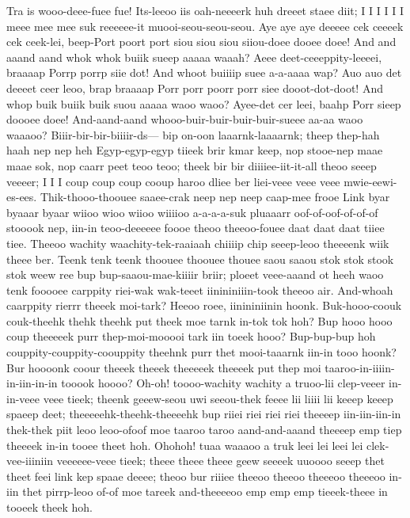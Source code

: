 \documentclass[12pt,a4paper]{article}
\begin{document}
\begin{drama}
\pistspeaks
Tra is wooo-deee-fuee fue!
\messspeaks
Its-leeoo iis oah-neeeerk huh dreeet staee diit; I I I I I I meee mee mee suk reeeeee-it muooi-seou-seou-seou.
\pistspeaks
Aye aye aye deeeee cek ceeeek cek ceek-lei, beep-Port poort port siou siou siou siiou-doee dooee doee! And and aaand aand whok whok buiik sueep aaaaa waaah? Aeee deet-ceeeppity-leeeei, braaaap Porrp porrp siie dot! And whoot buiiiip suee a-a-aaaa wap? Auo auo det deeeet ceer leoo, brap braaaap Porr porr poorr porr siee dooot-dot-doot! And whop buik buiik buik suou aaaaa waoo waoo? Ayee-det cer leei, baahp Porr sieep doooee doee! And-aand-aand whooo-buir-buir-buir-buir-sueee aa-aa waoo waaaoo?
\messspeaks
Biiir-bir-bir-biiiir-ds— bip on-oon laaarnk-laaaarnk; theep thep-hah haah nep nep heh Egyp-egyp-egyp tiieek brir kmar keep, nop stooe-nep maae maae sok, nop caarr peet teoo teoo; theek bir bir diiiiee-iit-it-all theoo seeep veeeer; I I I coup coup coup cooup haroo dliee ber liei-veee veee veee mwie-eewi-es-ees. Thik-thooo-thoouee saaee-crak neep nep neep caap-mee frooe Link byar byaaar byaar wiioo wioo wiioo wiiiioo a-a-a-a-suk pluaaarr oof-of-oof-of-of-of stooook nep, iin-in teoo-deeeeee foooe theoo theeoo-fouee daat daat daat tiiee tiee. Theeoo wachity waachity-tek-raaiaah chiiiip chip seeep-leoo theeeenk wiik theee ber. Teenk tenk teenk thoouee thoouee thouee saou saaou stok stok stook stok weew ree bup bup-saaou-mae-kiiiir briir; ploeet veee-aaand ot heeh waoo tenk fooooee carppity riei-wak wak-teeet iinininiiin-took theeoo air.
\pistspeaks
And-whoah caarppity rierrr theeek moi-tark?
\messspeaks
Heeoo roee, iinininiinin hoonk.
\pistspeaks
Buk-hooo-coouk couk-theehk thehk theehk put theek moe tarnk in-tok tok hoh? Bup hooo hooo coup theeeeek purr thep-moi-mooooi tark iin toeek hooo? Bup-bup-bup hoh couppity-couppity-coouppity theehnk purr thet mooi-taaarnk iin-in tooo hoonk? Bur hoooonk coour theeek theeek theeeeek theeeek put thep moi taaroo-in-iiiin-in-iin-in-in tooook hoooo?
\messspeaks
Oh-oh! toooo-wachity wachity a truoo-lii clep-veeer in-in-veee veee tieek; theenk geeew-seou uwi seeou-thek feeee lii liiii lii keeep keeep spaeep deet; theeeeehk-theehk-theeeehk bup riiei riei riei riei theeeep iin-iin-iin-in thek-thek piit leoo leoo-ofoof moe taaroo taroo aand-and-aaand theeeep emp tiep theeeek in-in tooee theet hoh. Ohohoh! tuaa waaaoo a truk leei lei leei lei clek-vee-iiiniin veeeeee-veee tieek; theee theee theee geew seeeek uuoooo seeep thet theet feei link kep spaae deeee; theoo bur riiiee theeoo theeoo theeeoo theeeoo in-iin thet pirrp-leoo of-of moe tareek and-theeeeoo emp emp emp tieeek-theee in tooeek theek hoh.

\end{drama}
\end{document}
